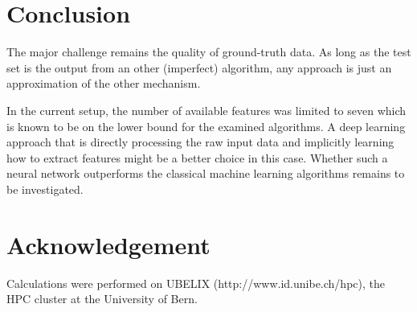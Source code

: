 \documentclass[journal]{IEEEtran}
\begin{document}
\section{Conclusion}
The major challenge remains the quality of ground-truth data. As long as the test set is the output from an other (imperfect) algorithm, any approach is just an approximation of the other mechanism.

In the current setup, the number of available features was limited to seven which is known to be on the lower bound for the examined algorithms. A deep learning approach that is directly processing the raw input data and implicitly learning how to extract features might be a better choice in this case. Whether such a neural network outperforms the classical machine learning algorithms remains to be investigated.

\section*{Acknowledgement}
Calculations were performed on UBELIX (http://www.id.unibe.ch/hpc), the HPC cluster at the University of Bern.



\end{document}
